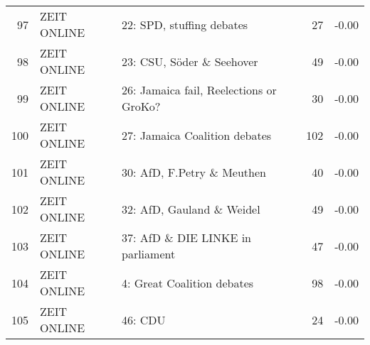\begin{table}[ht]
\begin{adjustbox}{width=\textwidth,totalheight=\textheight,keepaspectratio}
\begin{tabular}{rllrr}
  97 & ZEIT ONLINE & 22: SPD, stuffing debates &  27 & -0.00 \\ 
  98 & ZEIT ONLINE & 23: CSU, Söder \& Seehover &  49 & -0.00 \\ 
  99 & ZEIT ONLINE & 26: Jamaica fail, Reelections or GroKo? &  30 & -0.00 \\ 
  100 & ZEIT ONLINE & 27: Jamaica Coalition debates & 102 & -0.00 \\ 
  101 & ZEIT ONLINE & 30: AfD, F.Petry \& Meuthen &  40 & -0.00 \\ 
  102 & ZEIT ONLINE & 32: AfD, Gauland \& Weidel &  49 & -0.00 \\ 
  103 & ZEIT ONLINE & 37: AfD \& DIE LINKE in parliament &  47 & -0.00 \\ 
  104 & ZEIT ONLINE & 4: Great Coalition debates &  98 & -0.00 \\ 
  105 & ZEIT ONLINE & 46: CDU &  24 & -0.00 \\ 
   \hline
\end{tabular}
\label{t_sentscore_site}
\end{adjustbox}
\end{table}
